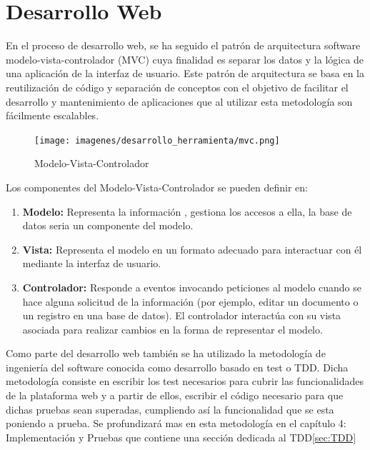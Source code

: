 \documentclass[a4paper,11pt]{book}
\begin{document}
\section{Desarrollo Web}

En el proceso de desarrollo web, se ha seguido el patrón de arquitectura software modelo-vista-controlador (MVC)\cite{mvc} cuya finalidad es separar los datos y la lógica de una aplicación de la interfaz de usuario. Este patrón de arquitectura se basa en la reutilización de código y separación de conceptos con el objetivo de facilitar el desarrollo y mantenimiento de aplicaciones que al utilizar esta metodología son fácilmente escalables. 

\begin{figure}[H] 
\centering 
\texttt{[image: imagenes/desarrollo\_herramienta/mvc.png]}
\caption{ Modelo-Vista-Controlador\cite{mvc2}  }  
\end{figure} 

Los componentes\cite{mvc3}\cite{mvc4} del Modelo-Vista-Controlador se pueden definir en:

\begin{enumerate}
\item \textbf{Modelo:} Representa la información , gestiona los accesos a ella, la base de datos seria un componente del modelo. 

\item \textbf{Vista:} Representa el modelo en un formato adecuado para interactuar con él mediante la interfaz de usuario.  

\item \textbf{Controlador:} Responde a eventos invocando peticiones al modelo cuando se hace alguna solicitud de la información (por ejemplo, editar un documento o un registro en una base de datos). El controlador interactúa con su vista asociada para realizar cambios en la forma de representar el modelo. 
\end{enumerate}


Como parte del desarrollo web también se ha utilizado la metodología de ingeniería del software conocida como desarrollo basado en test o TDD. Dicha metodología consiste en escribir los test necesarios para cubrir las funcionalidades de la plataforma web y a partir de ellos, escribir el código necesario para que dichas pruebas sean superadas, cumpliendo así la funcionalidad que se esta poniendo a prueba.  Se profundizará mas en esta metodología en el capítulo 4: Implementación y Pruebas que contiene una sección dedicada al TDD\ref{sec:TDD}
\end{document}
